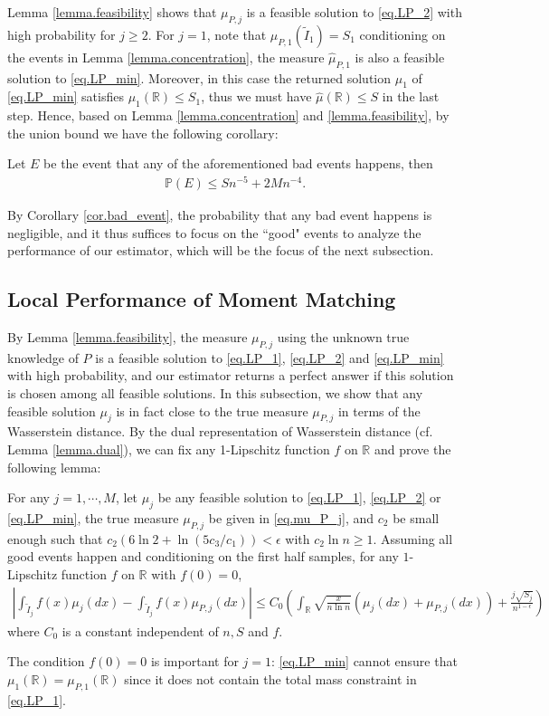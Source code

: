 \documentclass[final,12pt]{colt2018} %
\def \bP {\mathbb{P}}
\newcommand{\reals}{\mathbb{R}}
\begin{document}
Lemma \ref{lemma.feasibility} shows that $\mu_{P,j}$ is a feasible solution to \eqref{eq.LP_2} with high probability for $j\ge 2$. For $j=1$, note that $\mu_{P,1}(\tilde{I}_1)=S_1$ conditioning on the events in Lemma \ref{lemma.concentration}, the measure $\hat{\mu}_{P,1}$ is also a feasible solution to \eqref{eq.LP_min}. Moreover, in this case the returned solution $\mu_1$ of \eqref{eq.LP_min} satisfies $\mu_1(\reals)\le S_1$, thus we must have $\hat{\mu}(\reals)\le S$ in the last step. Hence, based on Lemma \ref{lemma.concentration} and \ref{lemma.feasibility}, by the union bound we have the following corollary:
\begin{corollary}\label{cor.bad_event}
	Let $E$ be the event that any of the aforementioned bad events happens, then
	\begin{align*}
	\bP(E) \le Sn^{-5} + 2Mn^{-4}.
	\end{align*}
\end{corollary}
By Corollary \ref{cor.bad_event}, the probability that any bad event happens is negligible, and it thus suffices to focus on the ``good" events to analyze the performance of our estimator, which will be the focus of the next subsection.

\subsection{Local Performance of Moment Matching}
By Lemma \ref{lemma.feasibility}, the measure $\mu_{P,j}$ using the unknown true knowledge of $P$ is a feasible solution to \eqref{eq.LP_1},  \eqref{eq.LP_2} and \eqref{eq.LP_min} with high probability, and our estimator returns a perfect answer if this solution is chosen among all feasible solutions. In this subsection, we show that any feasible solution $\mu_j$ is in fact close to the true measure $\mu_{P,j}$ in terms of the Wasserstein distance. By the dual representation of Wasserstein distance (cf. Lemma \ref{lemma.dual}), we can fix any 1-Lipschitz function $f$ on $\mathbb{R}$ and prove the following lemma:
\begin{lemma}\label{lemma.lmm}
	For any $j=1,\cdots,M$, let $\mu_j$ be any feasible solution to \eqref{eq.LP_1}, \eqref{eq.LP_2} or \eqref{eq.LP_min}, the true measure $\mu_{P,j}$ be given in \eqref{eq.mu_P_j}, and $c_2$ be small enough such that $c_2(6\ln 2+\ln(5c_3/c_1))<\epsilon$ with $c_2\ln n\ge 1$. Assuming all good events happen and conditioning on the first half samples, for any $1$-Lipschitz function $f$ on $\mathbb{R}$ with $f(0)=0$,
	\begin{align*}
	\left|\int_{\tilde{I}_j} f(x)\mu_j(dx) - \int_{\tilde{I}_j} f(x)\mu_{P,j}(dx)\right| \le C_0\left(\int_{\mathbb{R}} \sqrt{\frac{x}{n\ln n}}(\mu_j(dx)+\mu_{P,j}(dx)) + \frac{j\sqrt{S_j}}{n^{1-\epsilon}}\right)
	\end{align*}
	where $C_0$ is a constant independent of $n,S$ and $f$.
\end{lemma}
\begin{remark}
	The condition $f(0)=0$ is important for $j=1$: \eqref{eq.LP_min} cannot ensure that $\mu_1(\mathbb{R})=\mu_{P,1}(\mathbb{R})$ since it does not contain the total mass constraint in \eqref{eq.LP_1}.
\end{remark}
\end{document}
